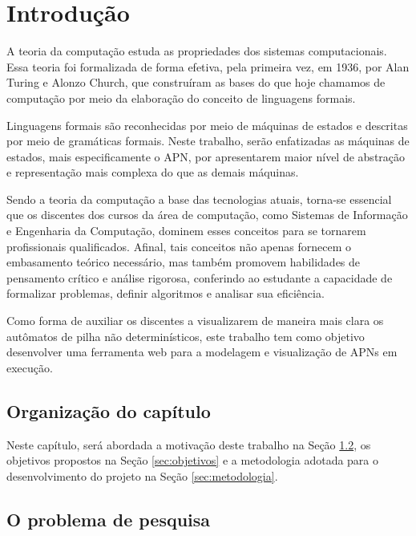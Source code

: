 \chapter{Introdução}
\label{cap:introducao}
A teoria da computação estuda as propriedades dos sistemas computacionais. Essa teoria foi formalizada de forma efetiva, pela primeira vez, em 1936, por Alan Turing e Alonzo Church, que construíram as bases do que hoje chamamos de computação por meio da elaboração do conceito de linguagens formais.

Linguagens formais são reconhecidas por meio de máquinas de estados e descritas por meio de gramáticas formais. Neste trabalho, serão enfatizadas as máquinas de estados, mais especificamente o \ac{APN}, por apresentarem maior nível de abstração e representação mais complexa do que as demais máquinas.

Sendo a teoria da computação a base das tecnologias atuais, torna-se essencial que os discentes dos cursos da área de computação, como Sistemas de Informação e Engenharia da Computação, dominem esses conceitos para se tornarem profissionais qualificados. Afinal, tais conceitos não apenas fornecem o embasamento teórico necessário, mas também promovem habilidades de pensamento crítico e análise rigorosa, conferindo ao estudante a capacidade de formalizar problemas, definir algoritmos e analisar sua eficiência.

Como forma de auxiliar os discentes a visualizarem de maneira mais clara os autômatos de pilha não determinísticos, este trabalho tem como objetivo desenvolver uma ferramenta web para a modelagem e visualização de APNs em execução.


\section{Organização do capítulo}

Neste capítulo, será abordada a motivação deste trabalho na Seção \ref{sec:problema}, os objetivos propostos na Seção \ref{sec:objetivos} e a metodologia adotada para o desenvolvimento do projeto na Seção \ref{sec:metodologia}.

\section{O problema de pesquisa}
\label{sec:problema}

